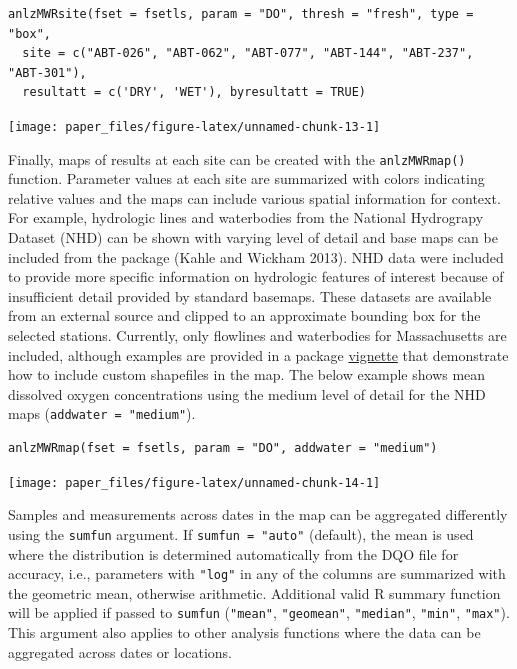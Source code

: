 \begin{verbatim}
anlzMWRsite(fset = fsetls, param = "DO", thresh = "fresh", type = "box", 
  site = c("ABT-026", "ABT-062", "ABT-077", "ABT-144", "ABT-237", "ABT-301"),
  resultatt = c('DRY', 'WET'), byresultatt = TRUE)
\end{verbatim}

\begin{center}\texttt{[image: paper\_files/figure-latex/unnamed-chunk-13-1]} \end{center}

Finally, maps of results at each site can be created with the \texttt{anlzMWRmap()} function. Parameter values at each site are summarized with colors indicating relative values and the maps can include various spatial information for context. For example, hydrologic lines and waterbodies from the National Hydrograpy Dataset (NHD) can be shown with varying level of detail and base maps can be included from the  package (Kahle and Wickham 2013). NHD data were included to provide more specific information on hydrologic features of interest because of insufficient detail provided by standard basemaps. These datasets are available from an external source and clipped to an approximate bounding box for the selected stations. Currently, only flowlines and waterbodies for Massachusetts are included, although examples are provided in a package \href{https://massbays-tech.github.io/MassWateR/articles/modifying.html\#modifying-masswater-plots}{vignette} that demonstrate how to include custom shapefiles in the map. The below example shows mean dissolved oxygen concentrations using the medium level of detail for the NHD maps (\texttt{addwater\ =\ "medium"}).

\begin{verbatim}
anlzMWRmap(fset = fsetls, param = "DO", addwater = "medium")
\end{verbatim}

\begin{center}\texttt{[image: paper\_files/figure-latex/unnamed-chunk-14-1]} \end{center}

Samples and measurements across dates in the map can be aggregated differently using the \texttt{sumfun} argument. If \texttt{sumfun\ =\ "auto"} (default), the mean is used where the distribution is determined automatically from the DQO file for accuracy, i.e., parameters with \texttt{"log"} in any of the columns are summarized with the geometric mean, otherwise arithmetic. Additional valid R summary function will be applied if passed to \texttt{sumfun} (\texttt{"mean"}, \texttt{"geomean"}, \texttt{"median"}, \texttt{"min"}, \texttt{"max"}). This argument also applies to other analysis functions where the data can be aggregated across dates or locations.

